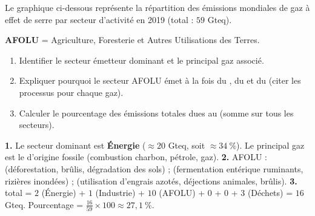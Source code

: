 \documentclass[11pt]{article}
\begin{document}
\begin{exercice}
Le graphique ci-dessous représente la répartition des émissions mondiales de gaz à effet de serre par secteur d'activité en 2019 (total : $59$ Gteq).
\begin{center}
\end{center}
\textbf{AFOLU} = Agriculture, Foresterie et Autres Utilisations des Terres.
\begin{enumerate}
\item Identifier le secteur émetteur dominant et le principal gaz associé.
\item Expliquer pourquoi le secteur AFOLU émet à la fois du , du  et du  (citer les processus pour chaque gaz).
\item Calculer le pourcentage des émissions totales dues au  (somme sur tous les secteurs).
\end{enumerate}
\end{exercice}

\begin{corrige}[Exercice 1]
\textbf{1.} Le secteur dominant est \textbf{Énergie} ($\approx 20$ Gteq, soit $\approx 34\ \%$). Le principal gaz est le  d'origine fossile (combustion charbon, pétrole, gaz).
\textbf{2.} AFOLU :  (déforestation, brûlis, dégradation des sols) ;  (fermentation entérique ruminants, rizières inondées) ;  (utilisation d'engrais azotés, déjections animales, brûlis).
\textbf{3.}  total = $2$ (Énergie) + $1$ (Industrie) + $10$ (AFOLU) + $0$ + $0$ + $3$ (Déchets) = $16$ Gteq. Pourcentage = $\frac{16}{59} \times 100 \approx 27,1\ \%$.
\end{corrige}
\end{document}
